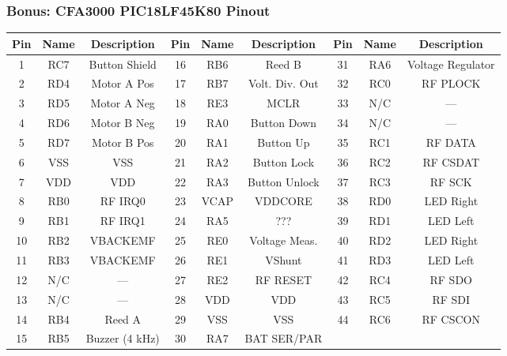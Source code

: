 \documentclass[aspectratio=169]{beamer}
\begin{document}
\begin{frame}
	\frametitle{Bonus: CFA3000 PIC18LF45K80 Pinout}

	\begin{scriptsize}
	\begin{tabular}{|c|c|c||c|c|c||c|c|c|}
		\hline
		Pin & Name & Description & Pin & Name & Description & Pin & Name & Description\\
		\hline
		 1 & RC7 & Button Shield  & 16 & RB6 & Reed B         & 31 & RA6 & Voltage Regulator\\
		 2 & RD4 & Motor A Pos    & 17 & RB7 & Volt. Div. Out & 32 & RC0 & RF PLOCK\\
		 3 & RD5 & Motor A Neg    & 18 & RE3 & MCLR           & 33 & N/C & ---\\
		 4 & RD6 & Motor B Neg    & 19 & RA0 & Button Down    & 34 & N/C & ---\\
		 5 & RD7 & Motor B Pos    & 20 & RA1 & Button Up      & 35 & RC1 & RF DATA\\
		 6 & VSS & VSS            & 21 & RA2 & Button Lock    & 36 & RC2 & RF CSDAT\\
		 7 & VDD & VDD            & 22 & RA3 & Button Unlock  & 37 & RC3 & RF SCK\\
		 8 & RB0 & RF IRQ0        & 23 & VCAP & VDDCORE       & 38 & RD0 & LED Right\\
		 9 & RB1 & RF IRQ1        & 24 & RA5 & ???            & 39 & RD1 & LED Left\\
		10 & RB2 & VBACKEMF       & 25 & RE0 & Voltage Meas.  & 40 & RD2 & LED Right\\
		11 & RB3 & VBACKEMF       & 26 & RE1 & VShunt         & 41 & RD3 & LED Left\\
		12 & N/C & ---            & 27 & RE2 & RF RESET       & 42 & RC4 & RF SDO\\
		13 & N/C & ---            & 28 & VDD & VDD            & 43 & RC5 & RF SDI\\
		14 & RB4 & Reed A         & 29 & VSS & VSS            & 44 & RC6 & RF CSCON\\
		15 & RB5 & Buzzer (4 kHz) & 30 & RA7 & BAT SER/PAR    & & &\\
		\hline
	\end{tabular}
	\end{scriptsize}
\end{frame}
\end{document}
